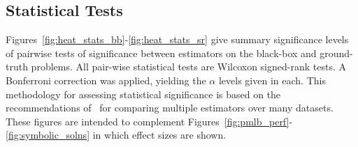 \subsection{Statistical Tests}
Figures~\ref{fig:heat_stats_bb}-\ref{fig:heat_stats_sr} give summary significance levels of pairwise tests of significance between estimators on the black-box and ground-truth problems. 
All pair-wise statistical tests are Wilcoxon signed-rank tests. 
A Bonferroni correction was applied, yielding the $\alpha$ levels given in each. 
This methodology for assessing statistical significance is based on the recommendations of~\citet{demsarStatisticalComparisonsClassifiers2006a} for comparing multiple estimators over many datasets.
These figures are intended to complement Figures~\ref{fig:pmlb_perf}-\ref{fig:symbolic_solns} in which effect sizes are shown. 

